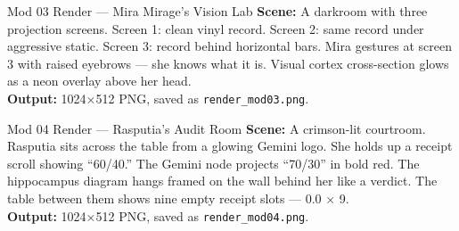 \documentclass[12pt, a4paper]{article}
\begin{document}
\begin{auditbox}{Mod 03 Render — Mira Mirage's Vision Lab}
\textbf{Scene:} A darkroom with three projection screens. Screen 1: clean vinyl record. Screen 2: same record under aggressive static. Screen 3: record behind horizontal bars. Mira gestures at screen 3 with raised eyebrows — she knows what it is. Visual cortex cross-section glows as a neon overlay above her head.\\
\textbf{Output:} 1024×512 PNG, saved as \texttt{render\_mod03.png}.
\end{auditbox}

\begin{auditbox}{Mod 04 Render — Rasputia's Audit Room}
\textbf{Scene:} A crimson-lit courtroom. Rasputia sits across the table from a glowing Gemini logo. She holds up a receipt scroll showing ``60/40.'' The Gemini node projects ``70/30'' in bold red. The hippocampus diagram hangs framed on the wall behind her like a verdict. The table between them shows nine empty receipt slots — 0.0 × 9.\\
\textbf{Output:} 1024×512 PNG, saved as \texttt{render\_mod04.png}.
\end{auditbox}

%
\end{document}
